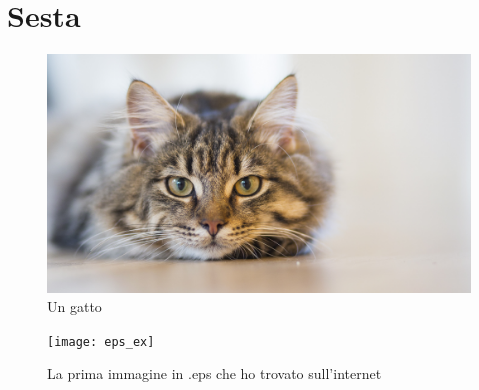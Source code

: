 \documentclass{article}
\begin{document}
	\clearpage

	\section*{Sesta}

	\Blindtext[1][3]

	\begin{figure}[h]
	\begin{center}
		\includegraphics[width = .5\linewidth]{cat}
	\end{center}
	\caption{Un gatto}
	\label{fig:fig1}
	\end{figure}

	\Blindtext[1][3]
	
	\begin{figure}[h]
	\begin{center}
		\texttt{[image: eps\_ex]}
	\end{center}
	\caption{La prima immagine in .eps che ho trovato sull'internet}
	\label{fig:fig2}
	\end{figure}
	
\end{document}
